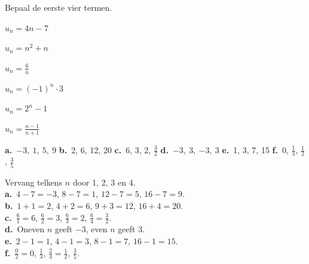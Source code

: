 \begin{oefeningen}
\begin{oefening}[1]\label{oef:h1-expl}
Bepaal de eerste vier termen.
\begin{reeks}
  \item $u_n = 4n - 7$
  \item $u_n = n^2 + n$
  \item $u_n = \tfrac{6}{n}$
  \item $u_n = (-1)^n \cdot 3$
  \item $u_n = 2^n - 1$
  \item $u_n = \tfrac{n-1}{n+1}$
\end{reeks}
\begin{solution}
\textbf{a.}~$-3,\ 1,\ 5,\ 9$ \quad \textbf{b.}~2, 6, 12, 20 \quad \textbf{c.}~6, 3, 2, $\tfrac32$ \quad \textbf{d.}~$-3,\ 3,\ {-3},\ 3$ \quad \textbf{e.}~1, 3, 7, 15 \quad \textbf{f.}~0, $\tfrac13$, $\tfrac12$, $\tfrac35$
\end{solution}
\begin{fullsolution}
Vervang telkens $n$ door 1, 2, 3 en 4.\\
\textbf{a.}~$4-7=-3$, $8-7=1$, $12-7=5$, $16-7=9$.\\
\textbf{b.}~$1+1=2$, $4+2=6$, $9+3=12$, $16+4=20$.\\
\textbf{c.}~$\tfrac61=6$, $\tfrac62=3$, $\tfrac63=2$, $\tfrac64=\tfrac32$.\\
\textbf{d.}~Oneven $n$ geeft $-3$, even $n$ geeft 3.\\
\textbf{e.}~$2-1=1$, $4-1=3$, $8-1=7$, $16-1=15$.\\
\textbf{f.}~$\tfrac02=0$, $\tfrac13$, $\tfrac24=\tfrac12$, $\tfrac35$.
\end{fullsolution}
\end{oefening}


\end{oefeningen}
